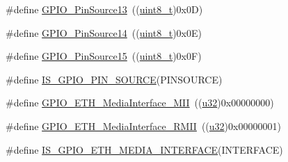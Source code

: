 \begin{DoxyCompactItemize}
$$\item 
\#define \hyperlink{group___g_p_i_o___pin__sources_gace4beb385facd306324fa9e362df5fda}{G\+P\+I\+O\+\_\+\+Pin\+Source13}~((\hyperlink{_p_e___types_8h_aba7bc1797add20fe3efdf37ced1182c5}{uint8\+\_\+t})0x0\+D)
\item 
\#define \hyperlink{group___g_p_i_o___pin__sources_ga5fbb540a86af4015a46ac16c61ddb1f7}{G\+P\+I\+O\+\_\+\+Pin\+Source14}~((\hyperlink{_p_e___types_8h_aba7bc1797add20fe3efdf37ced1182c5}{uint8\+\_\+t})0x0\+E)
\item 
\#define \hyperlink{group___g_p_i_o___pin__sources_ga9b29d9a9ecb1579ecedf4ea53ccbfd5b}{G\+P\+I\+O\+\_\+\+Pin\+Source15}~((\hyperlink{_p_e___types_8h_aba7bc1797add20fe3efdf37ced1182c5}{uint8\+\_\+t})0x0\+F)
\item 
\#define \hyperlink{group___g_p_i_o___pin__sources_ga689e4e72591136b6a8d4df9d895181f7}{I\+S\+\_\+\+G\+P\+I\+O\+\_\+\+P\+I\+N\+\_\+\+S\+O\+U\+R\+CE}(P\+I\+N\+S\+O\+U\+R\+CE)
\item 
\#define \hyperlink{group___ethernet___media___interface_gae11ff25c61c4f22f55118f9f88f6d465}{G\+P\+I\+O\+\_\+\+E\+T\+H\+\_\+\+Media\+Interface\+\_\+\+M\+II}~((\hyperlink{agilefox_2library_2inc_2stm32f10x__type_8h_a2caf5cd7bcdbe1eefa727f44ffb10bac}{u32})0x00000000)
\item 
\#define \hyperlink{group___ethernet___media___interface_ga5ee3d057ee58149b1d1abdacfacd4a4e}{G\+P\+I\+O\+\_\+\+E\+T\+H\+\_\+\+Media\+Interface\+\_\+\+R\+M\+II}~((\hyperlink{agilefox_2library_2inc_2stm32f10x__type_8h_a2caf5cd7bcdbe1eefa727f44ffb10bac}{u32})0x00000001)
\item 
\#define \hyperlink{group___ethernet___media___interface_gaaba662c046aed61cb28aa10918bfd4c4}{I\+S\+\_\+\+G\+P\+I\+O\+\_\+\+E\+T\+H\+\_\+\+M\+E\+D\+I\+A\+\_\+\+I\+N\+T\+E\+R\+F\+A\+CE}(I\+N\+T\+E\+R\+F\+A\+CE)
\end{DoxyCompactItemize}
